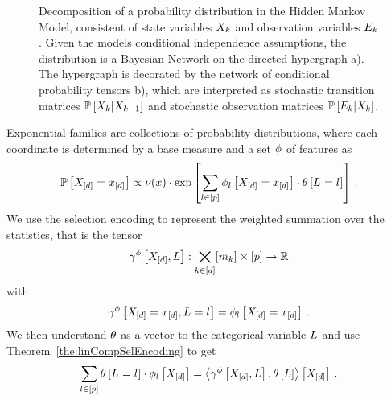 \begin{figure}[t!]
    \begin{center}
        
    \end{center}
    \caption{Decomposition of a probability distribution in the Hidden Markov Model, consistent of state variables $X_{k}$ and observation variables $E_{k}$.
    Given the models conditional independence assumptions, the distribution is a Bayesian Network on the directed hypergraph a).
    The hypergraph is decorated by the network of conditional probability tensors b), which are interpreted as stochastic transition matrices $\mathbb{P}\left[X_{k}|X_{k-1}\right]$ and stochastic observation matrices $\mathbb{P}\left[E_{k}|X_{k}\right]$.
    }
    \label{fig:HMM}
\end{figure}




\label{sec:exponentialFamilies}

Exponential families are collections of probability distributions, where each coordinate is determined by a base measure and a set $\phi$ of features as
\[ \mathbb{P}\left[X_{[d]}=x_{[d]}\right]  \propto \nu(x) \cdot \mathrm{exp}\left[\sum_{l\in[p]} \phi_{l}\left[X_{[d]}=x_{[d]}\right] \cdot \theta\left[L_{}=l_{}\right]\right] \, . \]
We use the selection encoding to represent the weighted summation over the statistics, that is the tensor
\[ \gamma^{\phi}\left[X_{[d]},L\right]: \bigtimes_{k\in[d]}[m_{k}] \times [p] \rightarrow \mathbb{R} \]
with
\[ \gamma^{\phi}\left[X_{[d]}=x_{[d]},L_{}=l_{}\right] = \phi_{l}\left[X_{[d]}=x_{[d]}\right] \, . \]
We then understand $\theta$ as a vector to the categorical variable $L$ and use Theorem~\ref{the:linCompSelEncoding} to get
\[ \sum_{l\in[p]}\theta\left[L_{}=l_{}\right]\cdot \phi_{l}\left[X_{[d]}\right]
= \left\langle \gamma^{\phi}\left[X_{[d]},L\right],\theta\left[L\right]\right\rangle \left[ X_{[d]} \right] \, . \]

